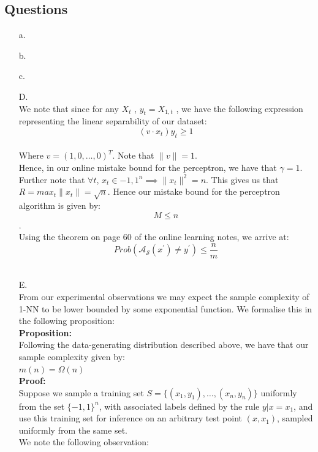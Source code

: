 \documentclass[12pt]{article}
\begin{document}
\subsection{Questions}
\begin{itemize}
    \item[a.]
    \item[b.]
    \item[c.]
    \item[D.]\\
    We note that since for any $X_{t}$ , $y_{t} = X_{1,t}$ , we have the following
     expression representing the linear separability of our dataset:\\
    \[(v \cdot x_{t})y_{t} \ge 1\]\\
    Where $v = (1,0, \dots, 0)^{T}$. Note that $\|v\| =1$.\\
    Hence, in our online mistake bound for the perceptron, we have that $\gamma =1$.
    Further note that $\forall t$, $x_{t} \in {-1,1}^{n} \implies \|x_{t}\|^{2}
    = n$. This gives us that $R = max_{t} \|x_{t}\| = \sqrt{n}$.
    Hence our mistake bound for the perceptron algorithm is given by:\\
    
    \[M \le n \].\\

    Using the theorem on page 60 of the online learning notes, we arrive at:\\

    \[Prob(\mathcal{A_{S}}(x ^{\prime}) \ne y^{\prime} ) \le \frac{n}{m}\]\\

     \item[E.]\\
     From our experimental observations we may expect the sample complexity of 1-NN
     to be lower bounded by some exponential function. We formalise this in the
     following proposition:\\

    \textbf{Proposition:}\\

    Following the data-generating distribution described above, we have that our sample complexity given by:\\

    $m(n) = \Omega (n)$ \\
    \textbf{Proof:}\\

    Suppose we sample a training set $S = \{(x_{1},y_{1}), \dots, (x_{n},y_{n})\} $ uniformly from the set $\{-1,1\}^{n}$, with associated labels
    defined by the rule $y | x = x_{1}$, and use this training set for inference on an
     arbitrary test point $(x,x_{1})$, sampled uniformly from the same set.
    \\
    We note the following observation:\\


\end{itemize}
\end{document}
